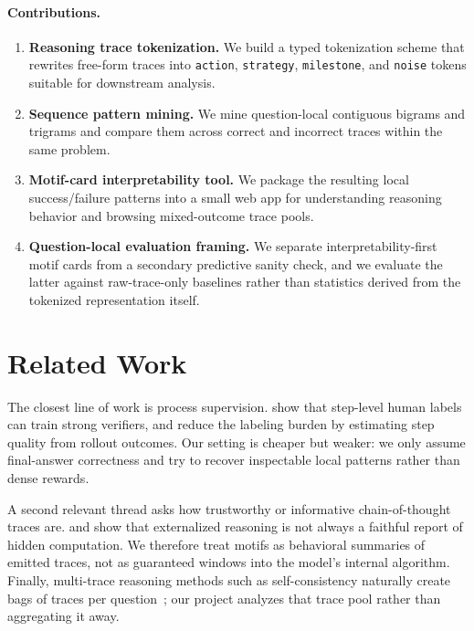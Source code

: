 \documentclass[11pt]{article}
\newcommand{\tok}[1]{\texttt{\small #1}}
\begin{document}
\paragraph{Contributions.}
\begin{enumerate}[leftmargin=*]
\item \textbf{Reasoning trace tokenization.} We build a typed tokenization scheme that rewrites free-form traces into \tok{action}, \tok{strategy}, \tok{milestone}, and \tok{noise} tokens suitable for downstream analysis.
\item \textbf{Sequence pattern mining.} We mine question-local contiguous bigrams and trigrams and compare them across correct and incorrect traces within the same problem.
\item \textbf{Motif-card interpretability tool.} We package the resulting local success/failure patterns into a small web app for understanding reasoning behavior and browsing mixed-outcome trace pools.
\item \textbf{Question-local evaluation framing.} We separate interpretability-first motif cards from a secondary predictive sanity check, and we evaluate the latter against raw-trace-only baselines rather than statistics derived from the tokenized representation itself.
\end{enumerate}

\section{Related Work}

The closest line of work is process supervision. \citet{lightman2023verify} show that step-level human labels can train strong verifiers, and \citet{wang2024mathshepherd} reduce the labeling burden by estimating step quality from rollout outcomes. Our setting is cheaper but weaker: we only assume final-answer correctness and try to recover inspectable local patterns rather than dense rewards.

A second relevant thread asks how trustworthy or informative chain-of-thought traces are. \citet{lanham2023faithfulness} and \citet{turpin2023unfaithful} show that externalized reasoning is not always a faithful report of hidden computation. We therefore treat motifs as behavioral summaries of emitted traces, not as guaranteed windows into the model’s internal algorithm. Finally, multi-trace reasoning methods such as self-consistency naturally create bags of traces per question~\citep{wang2023selfconsistency}; our project analyzes that trace pool rather than aggregating it away.
\end{document}
